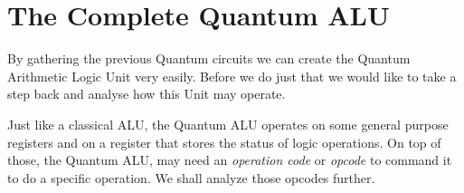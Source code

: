 \chapter{The Complete Quantum ALU}

By gathering the previous Quantum circuits we can create the Quantum Arithmetic Logic Unit very easily. Before
we do just that we would like to take a step back and analyse how this Unit may operate.

Just like a classical ALU, the Quantum ALU operates on some general purpose registers and on a register that stores
the status of logic operations. On top of those, the Quantum ALU, may need an \textit{operation code} or \textit{opcode}
to command it to do a specific operation. We shall analyze those opcodes further.



